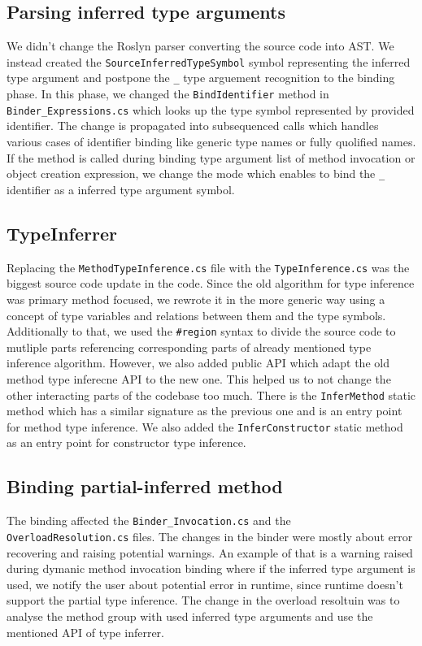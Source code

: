 \subsection{Parsing inferred type arguments}

We didn't change the Roslyn parser converting the source code into \ac{AST}.
We instead created the \texttt{SourceInferredTypeSymbol} symbol representing the inferred type argument and postpone the \texttt{\_} type arguement recognition to the binding phase.
In this phase, we changed the \texttt{BindIdentifier} method in \texttt{Binder\_Expressions.cs} which looks up the type symbol represented by provided identifier.
The change is propagated into subsequenced calls which handles various cases of identifier binding like generic type names or fully quolified names. 
If the method is called during binding type argument list of method invocation or object creation expression, we change the mode which enables to bind the \texttt{\_} identifier as a inferred type argument symbol.

\subsection{TypeInferrer}

Replacing the \texttt{MethodTypeInference.cs} file with the \texttt{TypeInference.cs} was the biggest source code update in the code.
Since the old algorithm for type inference was primary method focused, we rewrote it in the more generic way using a concept of type variables and relations between them and the type symbols.
Additionally to that, we used the \texttt{\#region} syntax to divide the source code to mutliple parts referencing corresponding parts of already mentioned type inference algorithm.
However, we also added public API which adapt the old method type inferecne API to the new one.
This helped us to not change the other interacting parts of the codebase too much.
There is the \texttt{InferMethod} static method which has a similar signature as the previous one and is an entry point for method type inference.
We also added the \texttt{InferConstructor} static method as an entry point for constructor type inference.

\subsection{Binding partial-inferred method}

The binding affected the \texttt{Binder\_Invocation.cs} and the \texttt{OverloadResolution.cs} files.
The changes in the binder were mostly about error recovering and raising potential warnings.
An example of that is a warning raised during dymanic method invocation binding where if the inferred type argument is used, we notify the user about potential error in runtime, since runtime doesn't support the partial type inference.
The change in the overload resoltuin was to analyse the method group with used inferred type arguments and use the mentioned API of type inferrer. 

